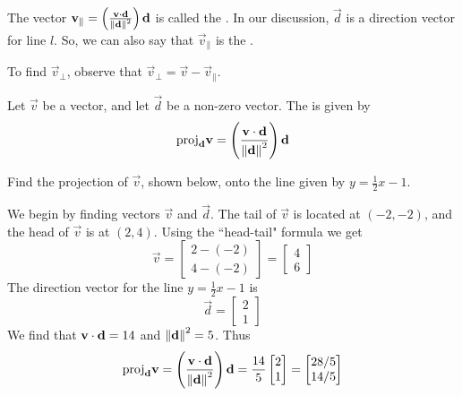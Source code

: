 \documentclass{ximera}
\begin{document}
The vector $\mathbf{v}_{\parallel}=\left(\frac{\mathbf{v}\cdot\mathbf{d}}{\left\lVert\mathbf{d}\right\rVert^2}\right)\mathbf{d}$ is called the .  In our discussion, $\vec{d}$ is a direction vector for line $l$.  So, we can also say that $\vec{v}_{\parallel}$ is the .

To find $\vec{v}_{\perp}$, observe that $\vec{v}_{\perp}=\vec{v}-\vec{v}_{\parallel}$.


\begin{definition}\label{def:projection}
Let $\vec{v}$ be a vector, and let $\vec{d}$ be a non-zero vector.  The  is given by 
$$\mbox{proj}_{\mathbf{d}}\mathbf{v}=\left(\frac{\mathbf{v}\cdot\mathbf{d}}{\left\lVert\mathbf{d}\right\rVert^2}\right)\mathbf{d}$$
\end{definition}

\begin{example}\label{ex:projection1}
Find the projection of $\vec{v}$, shown below, onto the line given by $y=\frac{1}{2}x-1$.

\begin{center}
\end{center}

\begin{explanation}
We begin by finding vectors $\vec{v}$ and $\vec{d}$. The tail of $\vec{v}$ is located at $(-2, -2)$, and the head of $\vec{v}$ is at $(2, 4)$.  Using the ``head-tail" formula we get 
$$\vec{v}=\begin{bmatrix}2-(-2)\\4-(-2)\end{bmatrix}=\begin{bmatrix}4\\6\end{bmatrix}$$ The direction vector for the line $y=\frac{1}{2}x-1$ is $$\vec{d}=\begin{bmatrix}2\\1\end{bmatrix}$$
We find that $\mathbf{v}\cdot\mathbf{d}=14$ and $\left\lVert\mathbf{d}\right\rVert^2=5$.
Thus $$\mbox{proj}_{\mathbf{d}}\mathbf{v}=\left(\frac{\mathbf{v}\cdot\mathbf{d}}{\left\lVert\mathbf{d}\right\rVert^2}\right)\mathbf{d}=\frac{14}{5}\begin{bmatrix}2\\1\end{bmatrix}=\begin{bmatrix}28/5\\14/5\end{bmatrix}$$
\end{explanation}
\end{example}
\end{document}
